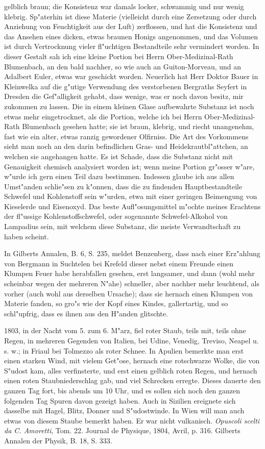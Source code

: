 \documentclass[a4paper, 11pt, oneside, polutonikogreek, german]{article}
\begin{document}
gelblich braun; die Konsistenz war damals locker, schwammig und nur wenig klebrig. Sp"aterhin ist diese Materie (vielleicht durch eine Zersetzung oder durch Anziehung von Feuchtigkeit aus der Luft) zerflossen, und hat die Konsistenz und das Ansehen eines dicken, etwas braunen Honigs angenommen, und das Volumen ist durch Vertrocknung vieler fl"uchtigen Bestandteile sehr vermindert worden. In dieser Gestalt sah ich eine kleine Portion bei Herrn Ober-Medizinal-Rath Blumenbach, an den bald nachher, so wie auch an Guiton-Morveau, und an Adalbert Euler, etwas war geschickt worden. Neuerlich hat Herr Doktor Bauer in Kleinwelka auf die g"utige Verwendung des verstorbenen Bergraths Seyfert in Dresden die Gef"alligkeit gehabt, dass wenige, was er noch davon besitz, mir zukommen zu lassen. Die in einem kleinen Glase aufbewahrte Substanz ist noch etwas mehr eingetrocknet, als die Portion, welche ich bei Herrn Ober-Medizinal-Rath Blumenbach gesehen hatte; sie ist braun, klebrig, und riecht unangenehm, fast wie ein alter, etwas ranzig gewordener Olfirniss. Die Art des Vorkommens sieht man noch an den darin befindlichen Gras- und Heidekrautbl"attchen, an welchen sie angehangen hatte. Es ist Schade, dass die Substanz nicht mit Genauigkeit chemisch analysiert worden ist; wenn meine Portion gr"osser w"are, w"urde ich gern einen Teil dazu bestimmen. Indessen glaube ich aus allen Umst"anden schlie"sen zu k"onnen, dass die zu findenden Hauptbestandteile Schwefel und Kohlenstoff sein w"urden, etwa mit einer geringen Beimengung von Kieselerde und Eisenoxyd. Das beste Aufl"osungsmittel m"ochte meines Erachtens der fl"ussige Kohlenstoffschwefel, oder sogenannte Schwefel-Alkohol von Lampadius sein, mit welchem diese Substanz, die meiste Verwandtschaft zu haben scheint.

In Gilberts Annalen, B. 6, S. 235, meldet Benzenberg, dass nach einer Erz"ahlung von Bergmann in Suchtelen bei Krefeld dieser nebst einem Freunde einen Klumpen Feuer habe herabfallen gesehen, erst langsamer, und dann (wohl mehr scheinbar wegen der mehreren N"ahe) schneller, aber nachher mehr leuchtend, als vorher (auch wohl aus derselben Ursache); dass sie hernach einen Klumpen von Materie fanden, so gro"s wie der Kopf eines Kindes, gallertartig, und so schl"upfrig, dass es ihnen aus den H"anden glitschte.

1803, in der Nacht vom 5. zum 6. M"arz, fiel roter Staub, teils mit, teils ohne Regen, in mehreren Gegenden von Italien, bei Udine, Venedig, Treviso, Neapel u. s. w.; in Friaul bei Tolmezzo als roter Schnee. In Apulien bemerkte man erst einen starken Wind, mit vielem Get"ose, hernach eine rotschwarze Wolke, die von S"udost kam, alles verfinsterte, und erst einen gelblich roten Regen, und hernach einen roten Staubniederschlag gab, und viel Schrecken erregte. Dieses dauerte den ganzen Tag fort, bis abends um 10 Uhr, und es sollen sich noch den ganzen folgenden Tag Spuren davon gezeigt haben. Auch in Sizilien ereignete sich dasselbe mit Hagel, Blitz, Donner und S"udostwinde. In Wien will man auch etwas von diesem Staube bemerkt haben. Er war nicht vulkanisch. \emph{Opuscoli scelti da C. Amoretti}, Tom. 22. Journal de Physique, 1804, Avril, p. 316. Gilberts Annalen der Physik, B. 18, S. 333.
\end{document}
